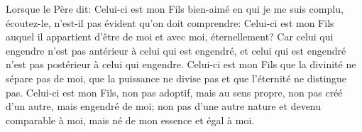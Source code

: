 Lorsque le Père dit:
	Celui-ci est mon Fils bien-aimé en qui je me suis complu, écoutez-le,
	n’est-il pas évident qu’on doit comprendre:
	Celui-ci est mon Fils
		auquel il appartient d’être de moi et avec moi, éternellement?
Car celui qui engendre n’est pas antérieur à celui qui est engendré,
	et celui qui est engendré n’est pas postérieur à celui qui engendre.
Celui-ci est mon Fils que la divinité ne sépare pas de moi,
	que la puissance ne divise pas et que l’éternité ne distingue pas.
Celui-ci est mon Fils, non pas adoptif, mais au sens propre,
	non pas créé d’un autre, mais engendré de moi;
	non pas d’une autre nature et devenu comparable à moi,
	mais né de mon essence et égal à moi.
